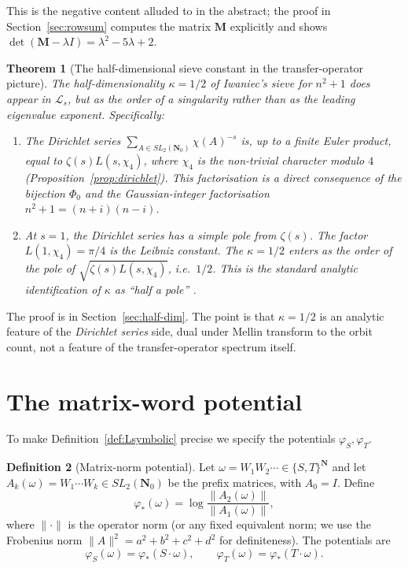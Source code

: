﻿\documentclass[11pt]{article}
\newtheorem{theorem}{Theorem}[section]
\theoremstyle{definition}
\newtheorem{definition}[theorem]{Definition}
\newcommand{\N}{\mathbf{N}}
\newcommand{\Nz}{\mathbf{N}_0}
\newcommand{\SLNz}{SL_2(\Nz)}
\newcommand{\Phio}{\Phi_0}
\newcommand{\Lop}{\mathcal{L}}
\newcommand{\chiA}{\chi}
\begin{document}
This is the negative content alluded to in the abstract; the proof in Section~\ref{sec:rowsum} computes the matrix $\mathbf{M}$ explicitly and shows $\det(\mathbf{M}-\lambda I)=\lambda^2-5\lambda+2$.

\begin{theorem}[The half-dimensional sieve constant in the transfer-operator picture]\label{thm:half-dim-correct}
The half-dimensionality $\kappa=1/2$ of Iwaniec's sieve for $n^2+1$ \cite{iwaniec1976,iwaniec1978} \emph{does} appear in $\Lop_s$, but as the order of a singularity rather than as the leading eigenvalue exponent. Specifically:
\begin{enumerate}
\item[(a)] The Dirichlet series $\sum_{A\in\SLNz} \chiA(A)^{-s}$ is, up to a finite Euler product, equal to $\zeta(s)L(s,\chi_4)$, where $\chi_4$ is the non-trivial character modulo $4$ (Proposition~\ref{prop:dirichlet}). This factorisation is a direct consequence of the bijection $\Phio$ and the Gaussian-integer factorisation $n^2+1=(n+i)(n-i)$.
\item[(b)] At $s=1$, the Dirichlet series has a simple pole from $\zeta(s)$. The factor $L(1,\chi_4)=\pi/4$ is the Leibniz constant. The $\kappa=1/2$ enters as the order of the pole of $\sqrt{\zeta(s)L(s,\chi_4)}$, i.e.\ $1/2$. This is the standard analytic identification of $\kappa$ as ``half a pole'' \cite[\S2]{iwaniec1976}.
\end{enumerate}
\end{theorem}

The proof is in Section~\ref{sec:half-dim}. The point is that $\kappa=1/2$ is an analytic feature of the \emph{Dirichlet series} side, dual under Mellin transform to the orbit count, not a feature of the transfer-operator spectrum itself.

\section{The matrix-word potential}\label{sec:potentials}

To make Definition~\ref{def:Lsymbolic} precise we specify the potentials $\varphi_S,\varphi_T$.

\begin{definition}[Matrix-norm potential]\label{def:potentials}
Let $\omega=W_1W_2\cdots\in\{S,T\}^\N$ and let $A_k(\omega)=W_1\cdots W_k\in\SLNz$ be the prefix matrices, with $A_0=I$. Define
\[
\varphi_*(\omega) = \log\frac{\|A_2(\omega)\|}{\|A_1(\omega)\|},
\]
where $\|\cdot\|$ is the operator norm (or any fixed equivalent norm; we use the Frobenius norm $\|A\|^2=a^2+b^2+c^2+d^2$ for definiteness). The potentials are
\[
\varphi_S(\omega) = \varphi_*(S\cdot\omega),\qquad \varphi_T(\omega)=\varphi_*(T\cdot\omega).
\]
\end{definition}
\end{document}

